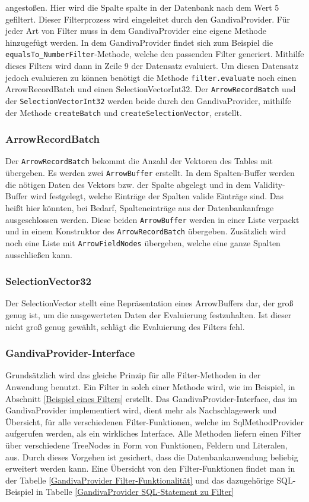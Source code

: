 angestoßen. Hier wird die Spalte spalte in der Datenbank nach dem Wert 5 gefiltert. Dieser Filterprozess wird eingeleitet durch den GandivaProvider.
Für jeder Art von Filter muss in dem GandivaProvider eine eigene Methode hinzugefügt werden. In dem GandivaProvider findet sich zum Beispiel die \texttt{equalsTo\_NumberFilter}-Methode, welche den passenden Filter generiert.
Mithilfe dieses Filters wird dann in Zeile 9 der Datensatz evaluiert. Um diesen Datensatz jedoch evaluieren zu können benötigt die Methode \texttt{filter.evaluate} noch einen ArrowRecordBatch und einen SelectionVectorInt32.
Der \texttt{ArrowRecordBatch} und der \texttt{SelectionVectorInt32} werden beide durch den GandivaProvider, mithilfe der Methode \texttt{createBatch} und \texttt{createSelectionVector}, erstellt.


\subsubsection{ArrowRecordBatch}

Der \texttt{ArrowRecordBatch} bekommt die Anzahl der Vektoren des Tables mit übergeben.
Es werden zwei \texttt{ArrowBuffer} erstellt. In dem Spalten-Buffer werden die nötigen Daten des Vektors bzw. der Spalte abgelegt und in dem Validity-Buffer wird festgelegt, welche Einträge der Spalten valide Einträge sind. Das heißt hier könnten, bei Bedarf, Spalteneinträge aus der Datenbankanfrage ausgeschlossen werden.
Diese beiden \texttt{ArrowBuffer} werden in einer Liste verpackt und in einem Konstruktor des \texttt{ArrowRecordBatch} übergeben. Zusätzlich wird noch eine Liste mit \texttt{ArrowFieldNodes} übergeben, welche eine ganze Spalten ausschließen kann.

\subsubsection{SelectionVector32}

Der SelectionVector stellt eine Repräsentation eines ArrowBuffers dar, der groß genug ist, um die ausgewerteten Daten der Evaluierung festzuhalten. Ist dieser nicht groß genug gewählt, schlägt die Evaluierung des Filters fehl.


\subsubsection{GandivaProvider-Interface}
Grundsätzlich wird das gleiche Prinzip für alle Filter-Methoden in der Anwendung benutzt. Ein Filter in solch einer Methode wird, wie im Beispiel, in Abschnitt \ref{Beispiel eines Filters} erstellt. Das GandivaProvider-Interface, das im GandivaProvider implementiert wird, dient mehr als  Nachschlagewerk und Übersicht, für alle verschiedenen Filter-Funktionen, welche im SqlMethodProvider aufgerufen werden, als ein wirkliches Interface.
Alle Methoden liefern einen Filter über verschiedene TreeNodes in Form von Funktionen, Feldern und Literalen, aus. Durch dieses Vorgehen ist gesichert, dass die Datenbankanwendung beliebig erweitert werden kann.
Eine Übersicht von den Filter-Funktionen findet man in der Tabelle \ref{GandivaProvider Filter-Funktionalität} und das dazugehörige SQL-Beispiel  in Tabelle \ref{GandivaProvider SQL-Statement zu Filter}

